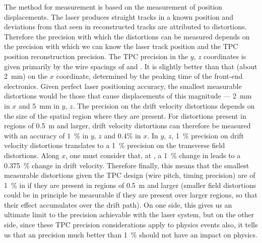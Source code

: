 The method for \efield measurement is based on the measurement of position displacements. The laser produces straight tracks in a known position and deviations from that seen in reconstructed tracks are attributed to \efield distortions. Therefore the precision with which the \efield distortions can be measured depends on the precision with which we can know the laser track position and the TPC position reconstruction precision.
The TPC precision in the $y$, $z$ coordinates is given primarily by the wire spacings of \uvpitch and \xgpitch. It is slightly better than that (about \SI{2}{\milli\m}) on the $x$ coordinate, determined by the \fepeaktime peaking time of the front-end electronics.
Given perfect laser positioning accuracy, the smallest measurable \efield distortions would be those that cause displacements of this magnitude --- \SI{2}{\milli\m} in $x$ and \SI{5}{\milli\m} in $y$, $z$. The precision on the drift velocity distortions depends on the size of the spatial region where they are present. For distortions present in regions of \SI{0.5}{\m} and larger, drift velocity distortions can therefore be measured with an accuracy of \SI{1}{\%} in $y$, $z$ and \num{0.4}\% in $x$. In $y$, $z$, \SI{1}{\%} precision on drift velocity distortions translates to a \SI{1}{\%} precision on the transverse field distortions. Along $x$, one must consider that, at \spmaxfield, a \SI{1}{\%} change in \efield leads to a \SI{0.375}{\%} change in drift velocity. Therefore finally, this means that the smallest measurable distortions given the TPC design (wire pitch, timing precision) are of \SI{1}{\%} in \efield if they are present in regions of \SI{0.5}{\m} and larger (smaller field distortions could be in principle be measurable if they are present over larger regions, so that their effect accumulates over the drift path).
On one side, this gives us an ultimate limit to the \efield precision achievable with the laser system, but on the other side, since these TPC precision considerations apply to physics events also, it tells us that an \efield precision much better than \SI{1}{\%} should not have an impact on physics.

